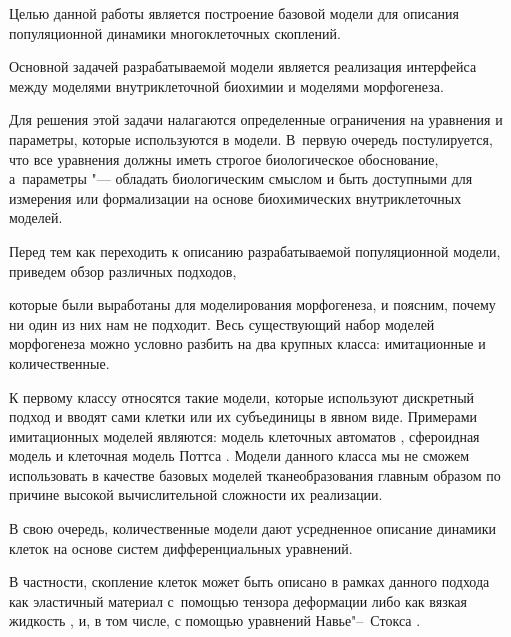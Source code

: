 \makerutitle



\newpage




Целью данной работы является построение базовой модели для описания популяционной динамики многоклеточных скоплений. %

Основной задачей разрабатываемой модели является реализация интерфейса между моделями внутриклеточной биохимии и моделями морфогенеза.

%

Для решения этой задачи налагаются определенные ограничения на уравнения и параметры, которые используются в модели. В~первую очередь постулируется, что все уравнения должны иметь строгое биологическое обоснование, а~параметры "--- обладать биологическим смыслом и быть доступными для измерения или формализации на основе биохимических внутриклеточных моделей.

 

 

Перед тем как переходить к описанию разрабатываемой популяционной модели, приведем обзор различных подходов, 

которые были выработаны для моделирования морфогенеза, и поясним, почему ни один из них нам не подходит. Весь существующий набор моделей морфогенеза можно условно разбить на два крупных класса: имитационные и количественные.

 

К первому классу относятся такие модели, которые используют дискретный подход   и вводят сами клетки или их субъединицы в явном виде. Примерами имитационных моделей являются: модель клеточных автоматов  \cite{Urdy:bib:Urdy2009}, сфероидная модель  \cite{Palsson:bib:Palsson2001,Drasdo:bib:Drasdo2005,Drasdo:bib:Drasdo2007} и клеточная модель Поттса \cite{Bauer:bib:Bauer2007,Hirashima:bib:Hirashima2009,Szabo:bib:Szabo2010}. Модели данного класса мы не сможем использовать в качестве базовых моделей тканеобразования главным образом по причине высокой вычислительной сложности их реализации.  



В свою очередь, количественные модели дают усредненное описание динамики клеток на основе систем дифференциальных уравнений. %

В частности, скопление клеток может быть описано в рамках данного подхода как эластичный материал с~помощью тензора деформации \cite{Taber:bib:Taber2009,Wyczalkowski:bib:Wyczalkowski2012} либо как вязкая жидкость \cite{Forgacs:bib:Forgacs1998,Ranft:bib:Ranft2010}, и, в том числе, с помощью уравнений Навье"--~Стокса \cite{Dillon:bib:Dillon1999}. 

